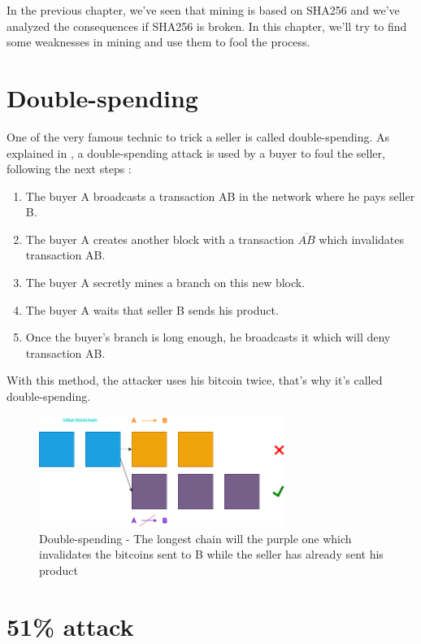  In the previous chapter, we've seen that mining is based on SHA256 and we've analyzed the consequences if SHA256 is broken. In this chapter, we'll try to find some weaknesses in mining and use them to fool the process.

\section{Double-spending}

One of the very famous technic to trick a seller is called double-spending. As explained in \cite{double_spending_def}, a double-spending attack is used by a buyer to foul the seller, following the next steps :

\begin{enumerate}
  \item The buyer A broadcasts a transaction AB in the network where he pays seller B.
  \item The buyer A creates another block with a transaction $\overline{AB}$ which invalidates transaction AB.
  \item The buyer A secretly mines a branch on this new block.
  \item The buyer A waits that seller B sends his product.
  \item Once the buyer's branch is long enough, he broadcasts it which will deny transaction AB.
\end{enumerate}

With this method, the attacker uses his bitcoin twice, that's why it's called double-spending. \newline

\begin{figure}[h]
\centering
\captionsetup{justification=centering}
\includegraphics[width=8cm]{Figures/doubleSpending}
\caption{Double-spending - The longest chain will the purple one which invalidates the bitcoins sent to B while the seller has already sent his product}
\end{figure}
\medskip

\section{51\% attack}

